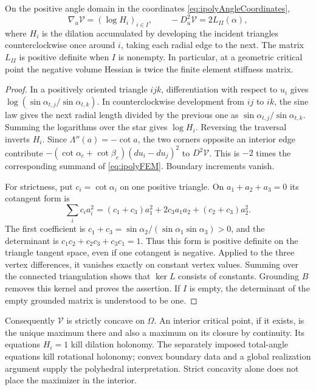 \begin{proposition}
\label{prop:ipolyHessian}
On the positive angle domain in the coordinates
\eqref{eq:ipolyAngleCoordinates},
\begin{equation}
 \nabla_u\mathcal V=(\log H_i)_{i\in I},\qquad
 -D_u^2\mathcal V=2L_{II}(\alpha),
 \label{eq:ipolyHessian}
\end{equation}
where $H_i$ is the dilation accumulated by developing the incident
triangles counterclockwise once around $i$, taking each radial edge to
the next. The matrix $L_{II}$ is positive definite when $I$ is nonempty.
In particular, at a geometric critical point
the negative volume Hessian is twice the finite element stiffness matrix.
\end{proposition}

\begin{proof}
In a positively oriented triangle $ijk$, differentiation with respect
to $u_i$ gives
$\log(\sin\alpha_{t,j}/\sin\alpha_{t,k})$.
In counterclockwise development from $ij$ to $ik$, the sine law gives
the next radial length divided by the previous one as
$\sin\alpha_{t,j}/\sin\alpha_{t,k}$. Summing the logarithms over the
star gives $\log H_i$. Reversing the traversal inverts $H_i$.
Since $\Lambda''(a)=-\cot a$, the two corners opposite an interior
edge contribute
$-(\cot\alpha_e+\cot\beta_e)(du_i-du_j)^2$ to $D^2\mathcal V$.
This is $-2$ times the corresponding summand of
\eqref{eq:ipolyFEM}. Boundary increments vanish.

For strictness, put $c_i=\cot\alpha_i$ on one positive triangle.
On $a_1+a_2+a_3=0$ its cotangent form is
\[
 \sum_i c_i a_i^2
  =(c_1+c_3)a_1^2+2c_3a_1a_2+(c_2+c_3)a_2^2.
\]
The first coefficient is
$c_1+c_3=\sin\alpha_2/(\sin\alpha_1\sin\alpha_3)>0$, and the
determinant is $c_1c_2+c_2c_3+c_3c_1=1$. Thus this form is positive
definite on the triangle tangent space, even if one cotangent is
negative. Applied to the three vertex differences, it vanishes exactly
on constant vertex values. Summing over the connected triangulation
shows that $\ker L$ consists of constants. Grounding $B$ removes this
kernel and proves the assertion. If $I$ is empty, the determinant of
the empty grounded matrix is understood to be one.
\end{proof}

Consequently $\mathcal V$ is strictly concave on $\Omega$. An interior
critical point, if it exists, is the unique maximum there and also a
maximum on its closure by continuity. Its equations $H_i=1$ kill
dilation holonomy. The separately imposed total-angle equations kill
rotational holonomy; convex boundary data and a global realization
argument supply the polyhedral interpretation. Strict concavity alone
does not place the maximizer in the interior.

